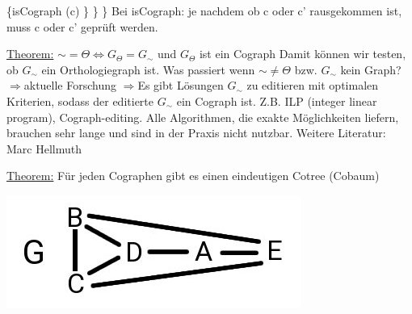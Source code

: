 \phantom{}\hspace{2.5cm} \{isCograph (c) \}
\newline
\phantom{}\hspace{1.5cm} \}
\newline
\}
\newline
Bei isCograph: je nachdem ob c oder c' rausgekommen ist, muss c oder c' geprüft werden.
\par\medskip
\underline{Theorem:}
\newline
$\sim = \Theta \Leftrightarrow G_\Theta = G_\sim$ und $G_\Theta$ ist ein Cograph
\newline
Damit können wir testen, ob $G_\sim$ ein Orthologiegraph ist.
\newline
Was passiert wenn $\sim \neq \Theta$ bzw. $G_\sim$ kein Graph?
\newline
$\Rightarrow$aktuelle Forschung $\Rightarrow$Es gibt Lösungen $G_\sim$ zu editieren mit optimalen Kriterien, sodass der editierte $G_\sim$ ein Cograph ist. Z.B. ILP (integer linear program), Cograph-editing. Alle Algorithmen, die exakte Möglichkeiten liefern, brauchen sehr lange und sind in der Praxis nicht nutzbar.
\newline
Weitere Literatur: Marc Hellmuth
\par\medskip
\underline{Theorem:}
\newline
Für jeden Cographen gibt es einen eindeutigen Cotree (Cobaum)
\newline
\begin{center}
	\includegraphics[scale=0.5]{lectures/161202/pix/08.jpg}
\end{center}
\renewcommand{\labelenumi}{\arabic{enumi}.}
